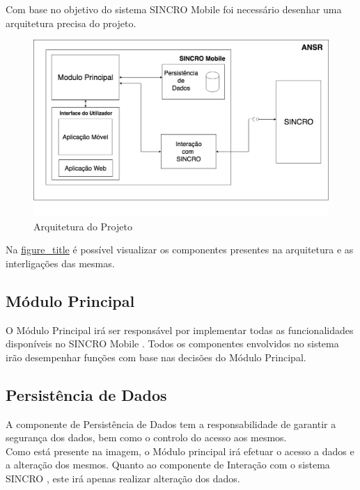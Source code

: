 \documentclass{article}
\begin{document}
Com base no objetivo do sistema SINCRO Mobile foi necessário desenhar
uma arquitetura precisa do projeto.

\begin{figure}
\centering
\includegraphics[scale=0.3]{./adoc_images/block_diagram.png}
\caption{Arquitetura do Projeto}
\end{figure}

Na \protect\hyperlink{arquiteture}{figure\_title} é possível visualizar
os componentes presentes na arquitetura e as interligações das mesmas.

\hypertarget{_m_dulo_principal}{%
\subsection{Módulo Principal}\label{_m_dulo_principal}}

O Módulo Principal irá ser responsável por implementar todas as
funcionalidades disponíveis no SINCRO Mobile . Todos os componentes
envolvidos no sistema irão desempenhar funções com base nas decisões do
Módulo Principal.

\hypertarget{_persist_ncia_de_dados}{%
\subsection{Persistência de Dados}\label{_persist_ncia_de_dados}}

A componente de Persistência de Dados tem a responsabilidade de garantir
a segurança dos dados, bem como o controlo do acesso aos mesmos.\\
Como está presente na imagem, o Módulo principal irá efetuar o acesso a
dados e a alteração dos mesmos. Quanto ao componente de Interação com o
sistema SINCRO , este irá apenas realizar alteração dos dados.
\end{document}
